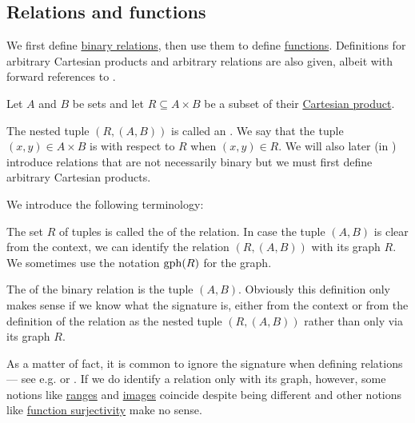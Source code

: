 \subsection{Relations and functions}\label{subsec:relations_and_function}

We first define \hyperref[def:binary_relation]{binary relations}, then use them to define \hyperref[def:function]{functions}. Definitions for arbitrary Cartesian products and arbitrary relations are also given, albeit with forward references to .

\begin{definition}\label{def:binary_relation}
  Let \( A \) and \( B \) be sets and let \( R \subseteq A \times B \) be a subset of their \hyperref[def:binary_cartesian_product]{Cartesian product}.

  The nested tuple \( (R,  (A, B)) \) is called an . We say that the tuple \( (x, y) \in A \times B \) is  with respect to \( R \) when \( (x, y) \in R \). We will also later (in ) introduce relations that are not necessarily binary but we must first define arbitrary Cartesian products.

  We introduce the following terminology:
  \begin{thmenum}[series=def:binary_relation]
     The set \( R \) of tuples is called the  of the relation. In case the tuple \( (A, B) \) is clear from the context, we can identify the relation \( (R, (A, B)) \) with its graph \( R \). We sometimes use the notation \( \operatorname{gph}(R) \) for the graph.

     The  of the binary relation is the tuple \( (A, B) \). Obviously this definition only makes sense if we know what the signature is, either from the context or from the definition of the relation as the nested tuple \( (R, (A, B)) \) rather than only via its graph \( R \).

    As a matter of fact, it is common to ignore the signature when defining relations --- see e.g. \cite[7]{Kelley1955} or \cite[def. 2.1]{OpenLogicFull}. If we do identify a relation only with its graph, however, some notions like \hyperref[def:binary_relation/range]{ranges} and \hyperref[def:binary_relation/image]{images} coincide despite being different and other notions like \hyperref[def:function_invertibility/surjective]{function surjectivity} make no sense.


\end{thmenum}
\end{definition}
